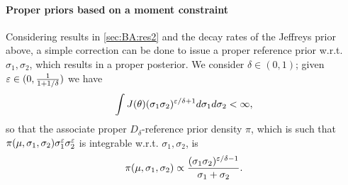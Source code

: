     \paragraph{Proper priors based on a moment constraint}
    Considering results in \cref{sec:BA:res2} and the decay rates of the Jeffreys prior above, a simple correction can be done to issue a proper reference prior w.r.t. $\sigma_1,\sigma_2$, which results in a proper posterior.
    We consider $\delta\in(0,1)$; given $\varepsilon\in(0,\frac{1}{1+1/\delta})$ we have 
        \begin{equation}
            \int J(\theta)(\sigma_1\sigma_2)^{\varepsilon/\delta+1} d\sigma_1d\sigma_2<\infty,
        \end{equation}
    so that the associate proper $D_\delta$-reference prior density $\pi$, which is such that $\pi(\mu,\sigma_1,\sigma_2)\sigma_1^\varepsilon\sigma_2^\varepsilon$ is integrable w.r.t. $\sigma_1,\sigma_2$, is
        \begin{equation}
            \pi(\mu,\sigma_1,\sigma_2) \propto \frac{(\sigma_1\sigma_2)^{\varepsilon/\delta -1}}{\sigma_1+\sigma_2}.        
        \end{equation}


